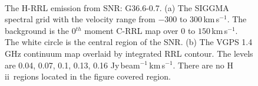 \documentclass[manuscript]{aastex61}
\newcommand{\hii}{{\rm H\,}{{\sc ii}}}
\newcommand{\kms}{\,km\,s$^{-1}$}
\begin{document}
\begin{figure}[H]
\centering
{}
\\
\caption{The H-RRL emission from SNR: G36.6-0.7.
          (a) The SIGGMA spectral grid with the velocity range from $-300$ to $300$\kms.
	  The background is the 0$^{th}$ moment C-RRL map over $0$ to $150$\kms.
	  The white circle is the central region of the SNR.
	  (b) The VGPS 1.4 GHz continuum map overlaid by integrated RRL contour.
	  The levels are 0.04, 0.07, 0.1, 0.13, 0.16 Jy\,beam$^{-1}$\kms.
	  There are no \hii\ regions located in the figure covered region.
	  }
\label{fig_snr-g366}
\end{figure}
\end{document}
